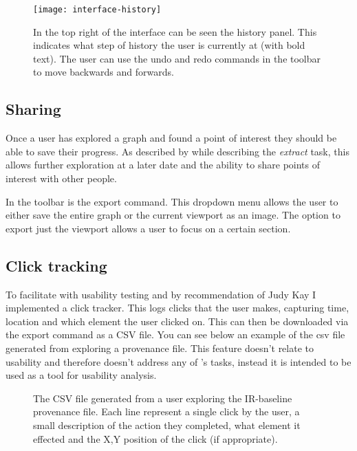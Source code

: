 \begin{figure}[h]
	\centering
	\texttt{[image: interface-history]}
	\caption{In the top right of the interface can be seen the history panel. This indicates what step of history the user is currently at (with bold text). The user can use the undo and redo commands in the toolbar to move backwards and forwards.}
	\label{fig:interface-history}
\end{figure}

\subsection{Sharing}
\label{sec:sharing}

Once a user has explored a graph and found a point of interest they should be able to save their progress. As described by \citeauthor{Shneiderman1996} while describing the \textit{extract} task, this allows further exploration at a later date and the ability to share points of interest with other people.

In the toolbar is the export command. This dropdown menu allows the user to either save the entire graph or the current viewport as an image. The option to export just the viewport allows a user to focus on a certain section. 

\subsection{Click tracking}
\label{sec:click_tracker}

To facilitate with usability testing and by recommendation of Judy Kay I implemented a click tracker. This logs clicks that the user makes, capturing time, location and which element the user clicked on. This can then be downloaded via the export command as a CSV file.  You can see below an example of the csv file generated from exploring a provenance file. This feature doesn't relate to usability and therefore doesn't address any of \citeauthor{Shneiderman1996}'s tasks, instead it is intended to be used as a tool for usability analysis.


\begin{figure}[h]
	\centering
	
	\caption{The CSV file generated from a user exploring the IR-baseline provenance file. Each line represent a single click by the user, a small description of the action they completed, what element it effected and the X,Y position of the click (if appropriate).}
	\label{fig:clickfile}
\end{figure}

